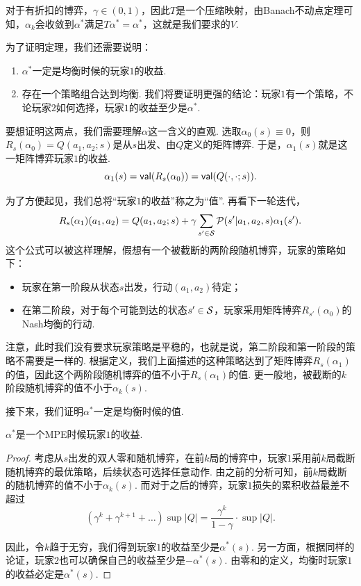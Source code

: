 对于有折扣的博弈，$\gamma\in (0,1)$，因此$T$是一个压缩映射，由Banach不动点定理可知，$\alpha_k$会收敛到$\alpha^*$满足$T\alpha^*=\alpha^*$，这就是我们要求的$V$.

为了证明定理，我们还需要说明：
\begin{enumerate}
    \item $\alpha^*$一定是均衡时候的玩家$1$的收益.
    \item 存在一个策略组合达到均衡. 我们将要证明更强的结论：玩家$1$有一个策略，不论玩家$2$如何选择，玩家$1$的收益至少是$\alpha^*$.
\end{enumerate}

要想证明这两点，我们需要理解$\alpha$这一含义的直观. 选取$\alpha_0(s)\equiv 0$，则$R_s(\alpha_0)=Q(a_1,a_2;s)$是从$s$出发、由$Q$定义的矩阵博弈. 于是，$\alpha_1(s)$就是这一矩阵博弈玩家$1$的收益. 
    \[\alpha_1(s)=\mathsf{val}(R_s(\alpha_0))=\mathsf{val}(Q(\cdot,\cdot;s)).\]

为了方便起见，我们总将“玩家$1$的收益”称之为“值”. 再看下一轮迭代，
\[R_s(\alpha_1)(a_1,a_2)=Q(a_1,a_2;s)+\gamma\sum_{s'\in \mathcal S}\mathcal P(s'|a_1,a_2,s)\alpha_1(s').\]
这个公式可以被这样理解，假想有一个被截断的两阶段随机博弈，玩家的策略如下：
    \begin{itemize}
        \item 玩家在第一阶段从状态$s$出发，行动$(a_1,a_2)$待定；
        \item 在第二阶段，对于每个可能到达的状态$s'\in \mathcal S$，玩家采用矩阵博弈$R_{s'}(\alpha_0)$的Nash均衡的行动.
    \end{itemize}

注意，此时我们没有要求玩家策略是平稳的，也就是说，第二阶段和第一阶段的策略不需要是一样的. 根据定义，我们上面描述的这种策略达到了矩阵博弈$R_s(\alpha_1)$的值，因此这个两阶段随机博弈的值不小于$R_s(\alpha_1)$的值. 更一般地，被截断的$k$阶段随机博弈的值不小于$\alpha_{k}(s)$. 

接下来，我们证明$\alpha^*$一定是均衡时候的值. 

\begin{lemma}
    $\alpha^*$是一个MPE时候玩家$1$的收益. 
\end{lemma}
\begin{proof}
考虑从$s$出发的双人零和随机博弈，在前$k$局的博弈中，玩家$1$采用前$k$局截断随机博弈的最优策略，后续状态可选择任意动作. 由之前的分析可知，前$k$局截断的随机博弈的值不小于$\alpha_k(s)$. 而对于之后的博弈，玩家$1$损失的累积收益最差不超过
\[(\gamma^k+\gamma^{k+1}+\dots)\sup|Q|=\frac{\gamma^k}{1-\gamma}\cdot \sup|Q|.\]

因此，令$k$趋于无穷，我们得到玩家$1$的收益至少是$\alpha^*(s)$. 另一方面，根据同样的论证，玩家$2$也可以确保自己的收益至少是$-\alpha^*(s)$. 由零和的定义，均衡时玩家$1$的收益必定是$\alpha^*(s)$. 
\end{proof}

